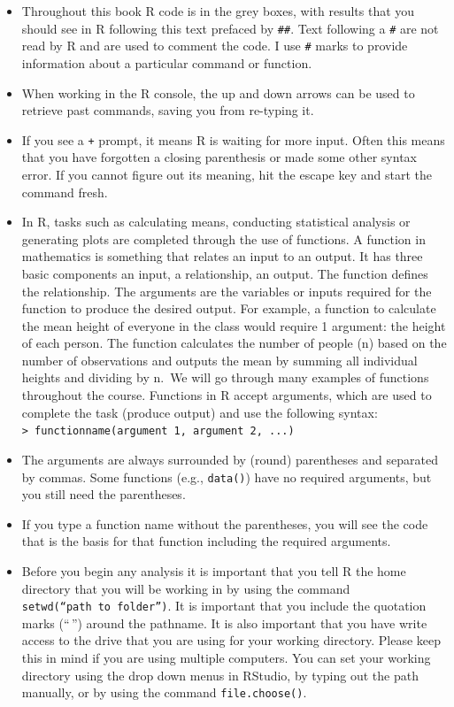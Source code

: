 \documentclass[
]{book}
\begin{document}
\begin{itemize}
\item
  Throughout this book R code is in the grey boxes, with results that you should see in R following this text prefaced by \texttt{\#\#}. Text following a \texttt{\#} are not read by R and are used to comment the code. I use \texttt{\#} marks to provide information about a particular command or function.
\item
  When working in the R console, the up and down arrows can be used to retrieve past commands, saving you from re-typing it.
\item
  If you see a \texttt{+} prompt, it means R is waiting for more input. Often this means that you have forgotten a closing parenthesis or made some other syntax error. If you cannot figure out its meaning, hit the escape key and start the command fresh.
\item
  In R, tasks such as calculating means, conducting statistical analysis or generating plots are completed through the use of functions. A function in mathematics is something that relates an input to an output. It has three basic components an input, a relationship, an output. The function defines the relationship. The arguments are the variables or inputs required for the function to produce the desired output. For example, a function to calculate the mean height of everyone in the class would require 1 argument: the height of each person. The function calculates the number of people (n) based on the number of observations and outputs the mean by summing all individual heights and dividing by n.~We will go through many examples of functions throughout the course. Functions in R accept arguments, which are used to complete the task (produce output) and use the following syntax: \texttt{\textgreater{}\ functionname(argument\ 1,\ argument\ 2,\ ...)}
\item
  The arguments are always surrounded by (round) parentheses and separated by commas. Some functions (e.g., \texttt{data()}) have no required arguments, but you still need the parentheses.
\item
  If you type a function name without the parentheses, you will see the code that is the basis for that function including the required arguments.
\item
  Before you begin any analysis it is important that you tell R the home directory that you will be working in by using the command \texttt{setwd(“path\ to\ folder”)}. It is important that you include the quotation marks (``\,'') around the pathname. It is also important that you have write access to the drive that you are using for your working directory. Please keep this in mind if you are using multiple computers. You can set your working directory using the drop down menus in RStudio, by typing out the path manually, or by using the command \texttt{file.choose()}.
\end{itemize}
\end{document}
